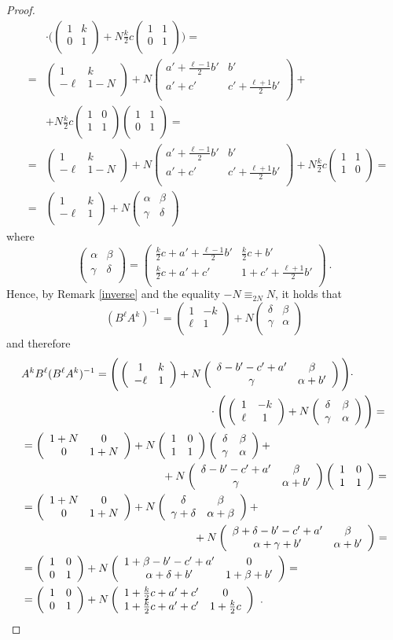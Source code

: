 \documentclass[10pt]{amsart}
\theoremstyle{plain}
\theoremstyle{definition}
\theoremstyle{remark}%
\newcommand{\mat}[4]{\left(\begin{array}{cc}
 #1 & #2\\
 #3 & #4\\
\end{array}\right)}
\begin{document}
\begin{proof}
\begin{eqnarray*}
 &&\cdot\Bigg(\mat{1}{k}{0}{1}+N\tfrac{k}{2}c\mat{1}{1}{0}{1}\Bigg)=\\
&=&\mat{1}{k}{-\ell}{1-N}+N\mat{a'+\frac{\ell-1}{2}b'}{b'}{a'+c'}{c'+\frac{\ell+1}{2}b'}+\\
&&+N\tfrac{k}{2}c\mat{1}{0}{1}{1}\mat{1}{1}{0}{1}=\\
&=&\mat{1}{k}{-\ell}{1-N}+N\mat{a'+\frac{\ell-1}{2}b'}{b'}{a'+c'}{c'+\frac{\ell+1}{2}b'}+N\tfrac{k}{2}c\mat{1}{1}{1}{0}=\\
&=&\mat{1}{k}{-\ell}{1}+N\mat{\alpha}{\beta}{\gamma}{\delta}
 \end{eqnarray*}
where $$\mat{\alpha}{\beta}{\gamma}{\delta}=\mat{\frac{k}{2}c+a'+\frac{\ell-1}{2}b'}{\frac{k}{2}c+b'}{\frac{k}{2}c+a'+c'}{1+c'+\frac{\ell+1}{2}b'}\ .$$ 
Hence, by Remark \ref{inverse} and the equality $-N\equiv_{2N}N$, it holds that
$$(B^\ell A^k)^{-1}=\mat{1}{-k}{\ell}{1}+N\mat{\delta}{\beta}{\gamma}{\alpha}$$
and therefore
\begin{align*}
&A^k B^\ell(B^\ell A^k)^{-1}=\Bigg(\mat{1}{k}{-\ell}{1}+N\mat{\delta-b'-c'+a'}{\beta}{\gamma}{\alpha+b'}\Bigg)\cdot\\
&\hspace{60mm}\cdot\Bigg(\mat{1}{-k}{\ell}{1}+N\mat{\delta}{\beta}{\gamma}{\alpha}\Bigg)=\\
&=\mat{1+N}{0}{0}{1+N}+N\mat{1}{0}{1}{1}\mat{\delta}{\beta}{\gamma}{\alpha}+\\
&\hspace{45mm}+N
\mat{\delta-b'-c'+a'}{\beta}{\gamma}{\alpha+b'}\mat{1}{0}{1}{1}=\\
&=\mat{1+N}{0}{0}{1+N}+N
\mat{\delta}{\beta}{\gamma+\delta}{\alpha+\beta}+\\
&\hspace{55mm}+N\mat{\beta+\delta-b'-c'+a'}{\beta}{\alpha+\gamma+b'}{\alpha+b'}=\\
&=\mat{1}{0}{0}{1}+N\mat{1+\beta-b'-c'+a'}{0}{\alpha+\delta+b'}{1+\beta+b'}=\\
&=\mat{1}{0}{0}{1}+N\mat{1+\frac{k}{2}c+a'+c'}{0}{1+\frac{k}{2}c+a'+c'}{1+\frac{k}{2}c}\ .
 \end{align*}
\end{proof}
\end{document}
